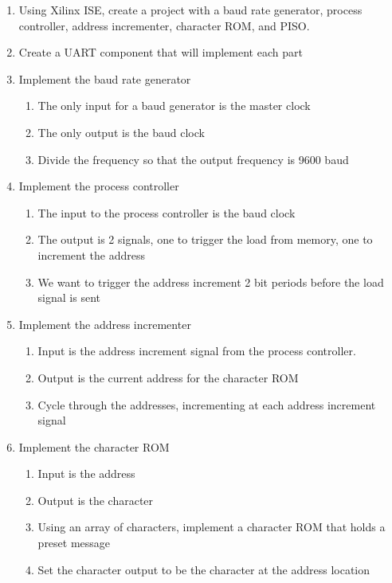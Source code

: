 \documentclass{article}
\begin{document}
\begin{enumerate}
	\item Using Xilinx ISE, create a project with a baud rate generator, process controller, address incrementer, character ROM, and PISO.
	\item Create a UART component that will implement each part
	\item Implement the baud rate generator
	\begin{enumerate}
		\item The only input for a baud generator is the master clock
		\item The only output is the baud clock
		\item Divide the frequency so that the output frequency is 9600 baud
	\end{enumerate}
	\item Implement the process controller
	\begin{enumerate}
		\item The input to the process controller is the baud clock
		\item The output is 2 signals, one to trigger the load from memory, one to increment the address
		\item We want to trigger the address increment 2 bit periods before the load signal is sent
	\end{enumerate}
	\item Implement the address incrementer
	\begin{enumerate}
		\item Input is the address increment signal from the process controller.
		\item Output is the current address for the character ROM
		\item Cycle through the addresses, incrementing at each address increment signal 
	\end{enumerate}
	\item Implement the character ROM
	\begin{enumerate}
		\item Input is the address
		\item Output is the character
		\item Using an array of characters, implement a character ROM that holds a preset message
		\item Set the character output to be the character at the address location
	\end{enumerate}

\end{enumerate}
\end{document}
